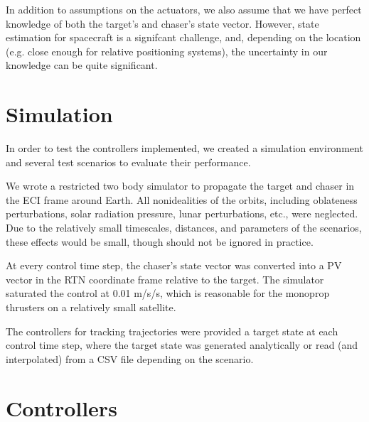 \documentclass[conference]{IEEEtran}
\begin{document}
In addition to assumptions on the actuators, we also assume that we have
perfect knowledge of both the target's and chaser's state vector. However,
state estimation for spacecraft is a signifcant challenge, and, depending on
the location (e.g. close enough for relative positioning systems), the uncertainty
in our knowledge can be quite significant.


\section{Simulation}

In order to test the controllers implemented, we created a simulation environment
and several test scenarios to evaluate their performance.

We wrote a restricted two body simulator to propagate the target and chaser
in the ECI frame around Earth. All nonidealities of the orbits, including
oblateness perturbations, solar radiation pressure, lunar perturbations, etc.,
were neglected. Due to the relatively small timescales, distances, and
parameters of the scenarios, these effects would be small, though should not be
ignored in practice.

At every control time step, the chaser's state vector was
converted into a PV vector in the RTN coordinate frame relative to the target.
The simulator saturated the control at 0.01 m/s/s, which is reasonable for the monoprop
thrusters on a relatively small satellite.

The controllers for tracking trajectories were provided a target state at each
control time step, where the target state was generated analytically or read
(and interpolated) from a CSV file depending on the scenario.



\section{Controllers}
\end{document}
